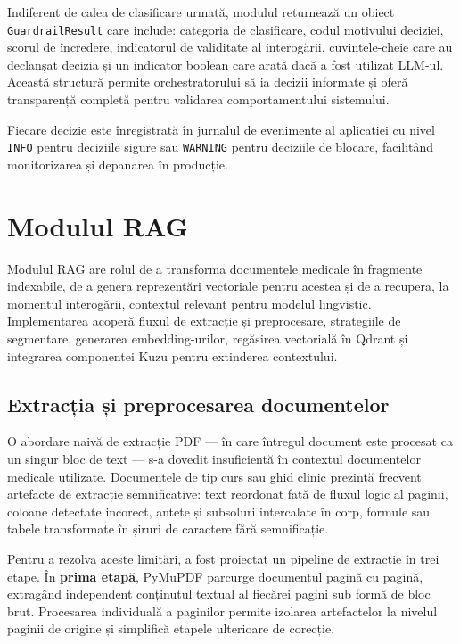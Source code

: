 \documentclass[12pt, a4paper, oneside, romanian]{teza-upb}
\begin{document}
Indiferent de calea de clasificare urmată, modulul returnează un obiect \texttt{GuardrailResult} care include: categoria de clasificare, codul motivului deciziei, scorul de încredere, indicatorul de validitate al interogării, cuvintele-cheie care au declanșat decizia și un indicator boolean care arată dacă a fost utilizat LLM-ul. Această structură permite orchestratorului să ia decizii informate și oferă transparență completă pentru validarea comportamentului sistemului.


Fiecare decizie este înregistrată în jurnalul de evenimente al aplicației cu nivel \texttt{INFO} pentru deciziile sigure sau \texttt{WARNING} pentru deciziile de blocare, facilitând monitorizarea și depanarea în producție.

\section{Modulul RAG}

Modulul RAG are rolul de a transforma documentele medicale în fragmente indexabile, de a genera reprezentări vectoriale pentru acestea și de a recupera, la momentul interogării, contextul relevant pentru modelul lingvistic. Implementarea acoperă fluxul de extracție și preprocesare, strategiile de segmentare, generarea embedding-urilor, regăsirea vectorială în Qdrant și integrarea componentei Kuzu pentru extinderea contextului.

\subsection{Extracția și preprocesarea  documentelor}

O abordare naivă de extracție PDF — în care întregul document este procesat ca un singur bloc de text — s-a dovedit insuficientă în contextul documentelor medicale utilizate. Documentele de tip curs sau ghid clinic prezintă frecvent artefacte de extracție semnificative: text reordonat față de fluxul logic al paginii, coloane detectate incorect, antete și subsoluri intercalate în corp, formule sau tabele transformate în șiruri de caractere fără semnificație.

Pentru a rezolva aceste limitări, a fost proiectat un pipeline de extracție în trei etape. În \textbf{prima etapă}, PyMuPDF parcurge documentul pagină cu pagină, extragând independent conținutul textual al fiecărei pagini sub formă de bloc brut. Procesarea individuală a paginilor permite izolarea artefactelor la nivelul paginii de origine și simplifică etapele ulterioare de corecție.
\end{document}
